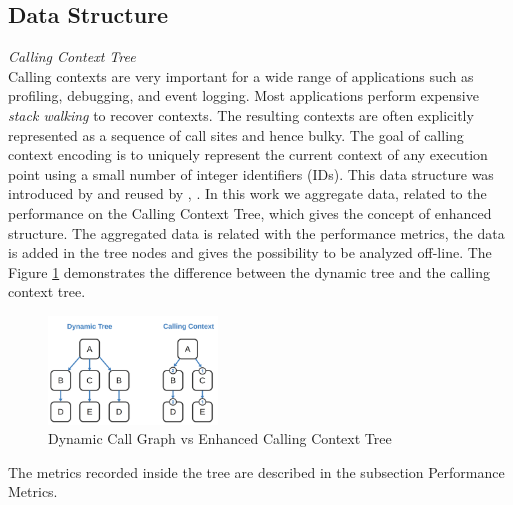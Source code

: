 \subsection{Data Structure}

\textit{Calling Context Tree}\\
Calling contexts are very important for a wide range of applications such as profiling, debugging, and event logging. Most applications perform expensive \textit{stack walking} to recover contexts\cite{precise}. The resulting contexts are often explicitly represented as a sequence of call sites and hence bulky. The goal of calling context encoding is to uniquely represent the current context of any execution point using a small number of integer identifiers (IDs). This data structure was introduced by \cite{27} and reused by \cite{4}, \cite{28}.
    In this work we aggregate data, related to the performance on the Calling Context Tree, which gives the concept of enhanced structure. The aggregated data is related with the performance metrics, the data is added in the tree nodes and gives the possibility to be analyzed off-line.
    The Figure \ref{fig:ecct_dt} demonstrates the difference between the dynamic tree and the calling context tree.
    \begin{figure}[h]
        \centering
        \includegraphics[width=0.40\textwidth]{figures/dynamic-calling.png}
        \caption{Dynamic Call Graph vs Enhanced Calling Context Tree }
        \label{fig:ecct_dt}
    \end{figure}
    The metrics recorded inside the tree are described in the subsection Performance Metrics.
    
